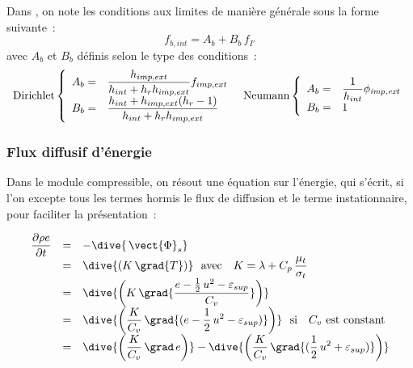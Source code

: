 Dans \CS, on note les conditions aux limites de manière générale sous
la forme suivante~:
\begin{equation}
f_{b,int}=A_b + B_b\,f_{I'}
\end{equation}
avec $A_b$ et $B_b$ définis selon le type des conditions~:
\begin{equation}
\begin{array}{c}
\text{Dirichlet}\left\{\begin{array}{ll}
    A_b = &\displaystyle\frac{h_{imp,ext}}{h_{int}+h_r h_{imp,ext} } f_{imp,ext}\\
    B_b = &\displaystyle\frac{h_{int}+h_{imp,ext}(h_r-1)}{h_{int}+h_r h_{imp,ext} }
                  \end{array}\right.
\text{\ \  Neumann}\left\{\begin{array}{ll}
    A_b = &\displaystyle\frac{1}{h_{int}}\phi_{\text{\it imp,ext}}\\
    B_b = &1
                  \end{array}\right.
\end{array}
\end{equation}

\subsubsection*{Flux diffusif d'énergie}

Dans le module compressible, on résout une équation sur l'énergie, qui s'écrit, si
l'on excepte tous les termes hormis le flux de diffusion et le terme
instationnaire, pour faciliter la présentation~:

\begin{equation}
\begin{array}{lll}
\displaystyle\frac{\partial \rho e}{\partial t} &=& - \dive{\,\vect{\Phi}_s}\\
&=& \displaystyle\dive{(K\,\grad{T})} \text{\ \ avec \ \ } K=\lambda+C_p\,\frac{\mu_t}{\sigma_t}\\
&=& \displaystyle\dive{\left(K\,\grad{\frac{e-\frac{1}{2}\,u^2-\varepsilon_{sup}}{C_v}}\right)} \\
&=& \displaystyle\dive{\left(\frac{K}{C_v}\,\grad{(e-\frac{1}{2}\,u^2-\varepsilon_{sup})}\right)} \text{\ \
si \ \ } C_v \text{\ est constant}\\
&=& \displaystyle\dive{\left(\frac{K}{C_v}\,\grad\,e\right)}
-\dive{\left(\frac{K}{C_v}\,\grad{(\frac{1}{2}\,u^2+\varepsilon_{sup})}\right)} \\

\end{array}
\end{equation}

